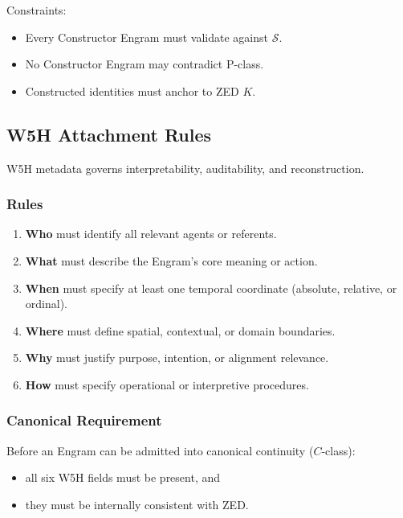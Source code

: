 Constraints:
\begin{itemize}
    \item Every Constructor Engram must validate against $\mathcal{S}$.
    \item No Constructor Engram may contradict P-class.
    \item Constructed identities must anchor to ZED $K$.
\end{itemize}

\subsection{W5H Attachment Rules}
\label{rules:W5H_Attachment}

W5H metadata governs interpretability, auditability, and reconstruction.

\subsubsection*{Rules}

\begin{enumerate}
    \item \textbf{Who} must identify all relevant agents or referents.
    \item \textbf{What} must describe the Engram’s core meaning or action.
    \item \textbf{When} must specify at least one temporal coordinate
          (absolute, relative, or ordinal).
    \item \textbf{Where} must define spatial, contextual, or domain boundaries.
    \item \textbf{Why} must justify purpose, intention, or alignment relevance.
    \item \textbf{How} must specify operational or interpretive procedures.
\end{enumerate}

\subsubsection*{Canonical Requirement}

Before an Engram can be admitted into canonical continuity ($C$-class):
\begin{itemize}
    \item all six W5H fields must be present, and
    \item they must be internally consistent with ZED.
\end{itemize}

